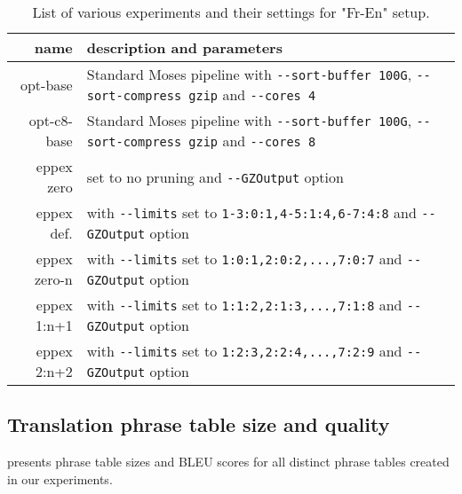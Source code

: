 \begin{table}[ht]
\centering
\begin{tabular}{ r p{10cm} }
name & description and parameters \\
\hline
\hline
opt-base      & Standard Moses pipeline with \verb|--sort-buffer 100G|, \verb|--sort-compress gzip| and \verb|--cores 4| \\
opt-c8-base   & Standard Moses pipeline with \verb|--sort-buffer 100G|, \verb|--sort-compress gzip| and \verb|--cores 8| \\
eppex zero    & \eppex{} set to no pruning and \verb|--GZOutput| option \\
eppex def.    & \eppex{} with \verb|--limits| set to \verb|1-3:0:1,4-5:1:4,6-7:4:8| and \verb|--GZOutput| option \\
eppex zero-n  & \eppex{} with \verb|--limits| set to \verb|1:0:1,2:0:2,...,7:0:7| and \verb|--GZOutput| option \\
eppex 1:n+1   & \eppex{} with \verb|--limits| set to \verb|1:1:2,2:1:3,...,7:1:8| and \verb|--GZOutput| option \\
eppex 2:n+2   & \eppex{} with \verb|--limits| set to \verb|1:2:3,2:2:4,...,7:2:9| and \verb|--GZOutput| option \\
\hline
\hline
\end{tabular}
\caption{\label{fr-en-80-scenarios}
List of various experiments and their settings for "Fr-En" setup.}
\end{table}

\subsection{Translation phrase table size and quality}

 presents phrase table sizes and BLEU scores for all
distinct phrase tables created in our experiments.

